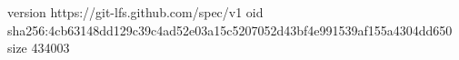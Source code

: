 version https://git-lfs.github.com/spec/v1
oid sha256:4cb63148dd129c39c4ad52e03a15c5207052d43bf4e991539af155a4304dd650
size 434003
